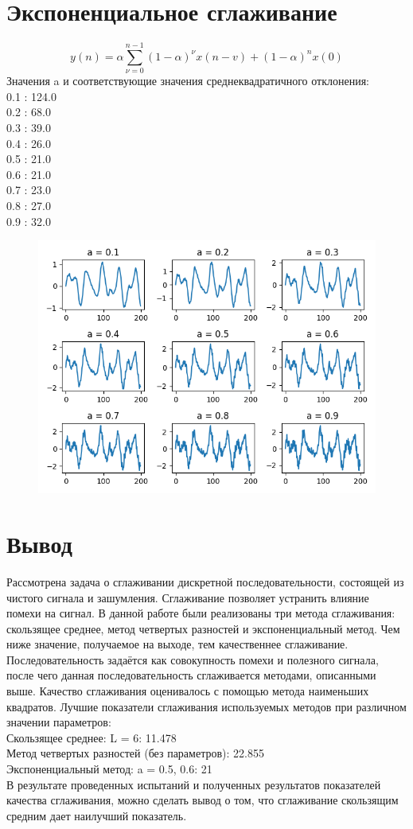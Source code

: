 \documentclass[12pt]{article}
\begin{document}
\section{Экспоненциальное сглаживание}
\[y(n) = \alpha \sum_{\nu=0}^{n-1}(1-\alpha)^\nu x(n-v) + (1 - \alpha)^n x(0) \]
Значения a и соответствующие значения среднеквадратичного отклонения: \\
0.1 : 124.0\\
0.2 : 68.0\\
0.3 : 39.0\\
0.4 : 26.0\\
0.5 : 21.0\\
0.6 : 21.0\\
0.7 : 23.0\\
0.8 : 27.0\\
0.9 : 32.0\\
\begin{figure}[htp]
\centering
\includegraphics[scale=1.00]{exp.png}
\caption{}
\label{}
\end{figure}

\section{Вывод}
Рассмотрена задача о сглаживании дискретной последовательности, состоящей из чистого сигнала и зашумления. Сглаживание позволяет устранить влияние помехи на сигнал. В данной работе были реализованы три метода сглаживания: скользящее среднее, метод четвертых разностей и экспоненциальный метод. Чем ниже значение, получаемое на выходе, тем качественнее сглаживание.\\
Последовательность задаётся как совокупность помехи и полезного сигнала, после чего данная последовательность сглаживается методами, описанными выше.
Качество сглаживания оценивалось с помощью метода наименьших квадратов.
Лучшие показатели сглаживания используемых методов при различном значении параметров:\\
Скользящее среднее: L = 6: 11.478\\
Метод четвертых разностей (без параметров): 22.855\\
Экспоненциальный метод: a = 0.5, 0.6: 21\\
В результате проведенных испытаний и полученных результатов показателей качества сглаживания, можно сделать вывод о том, что сглаживание скользящим средним дает наилучший показатель.
\end{document}
